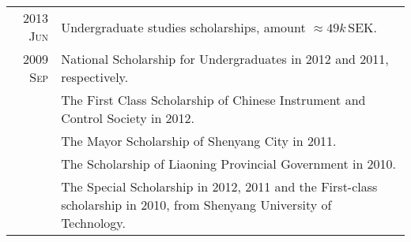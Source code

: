 \documentclass[a4paper,10pt]{article}
\begin{document}
\begin{savenotes}
\begin{longtable}{r|p{13cm}}
    \textsc{2013 Jun}	& Undergraduate studies scholarships, amount $\approx 49k\,\mathrm {SEK}$.\\
    \textsc{2009 Sep} & National Scholarship for Undergraduates in 2012 and 2011, respectively.\\
                      & The First Class Scholarship of Chinese Instrument and Control Society in 2012.\\
                      & The Mayor Scholarship of Shenyang City in 2011.\\
                      & The Scholarship of Liaoning Provincial Government in 2010.\\
                      & The Special Scholarship in 2012, 2011 and the First-class scholarship in 2010, from Shenyang University of Technology.\\
  \end{longtable}
\end{savenotes}
\end{document}
